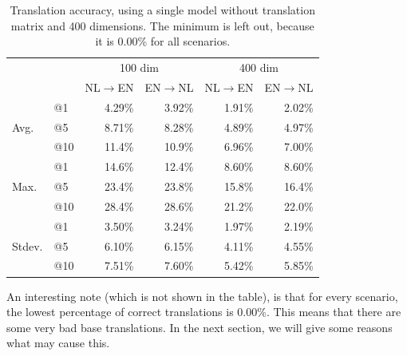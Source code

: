 \begin{table}[ht!]
  \centering
  \label{table:results_single_model_no_matrix}
  \begin{tabular}{ll|r|r|r|r|}
  \cline{3-6}                                       &     & \multicolumn{2}{|c|}{100 dim} & \multicolumn{2}{c|}{400 dim} \\ \cline{3-6} 
                                                    &     & NL$\to$EN   & EN$\to$NL       & NL$\to$EN   & EN$\to$NL      \\ \hline
    \multicolumn{1}{|l|}{\multirow{3}{*}{Avg.}}     & @1  & 4.29\%      & 3.92\%          & 1.91\%      & 2.02\%         \\ \cline{2-6} 
    \multicolumn{1}{|l|}{}                          & @5  & 8.71\%      & 8.28\%          & 4.89\%      & 4.97\%         \\ \cline{2-6} 
    \multicolumn{1}{|l|}{}                          & @10 & 11.4\%      & 10.9\%          & 6.96\%      & 7.00\%         \\ \hline 
    \multicolumn{1}{|l|}{\multirow{3}{*}{Max.}}     & @1  & 14.6\%      & 12.4\%          & 8.60\%      & 8.60\%         \\ \cline{2-6} 
    \multicolumn{1}{|l|}{}                          & @5  & 23.4\%      & 23.8\%          & 15.8\%      & 16.4\%         \\ \cline{2-6} 
    \multicolumn{1}{|l|}{}                          & @10 & 28.4\%      & 28.6\%          & 21.2\%      & 22.0\%         \\ \hline
    \multicolumn{1}{|l|}{\multirow{3}{*}{Stdev.}}   & @1  & 3.50\%      & 3.24\%          & 1.97\%      & 2.19\%         \\ \cline{2-6} 
    \multicolumn{1}{|l|}{}                          & @5  & 6.10\%      & 6.15\%          & 4.11\%      & 4.55\%         \\ \cline{2-6} 
    \multicolumn{1}{|l|}{}                          & @10 & 7.51\%      & 7.60\%          & 5.42\%      & 5.85\%         \\ \hline
  \end{tabular}
  \caption{Translation accuracy, using a single model without translation matrix and 400 dimensions. The minimum is left out, because it is 0.00\% for all scenarios.}
\end{table}

An interesting note (which is not shown in the table), is that for every scenario, the lowest percentage of correct translations is 0.00\%. This means that there are some very bad base translations. In the next section, we will give some reasons what may cause this.


